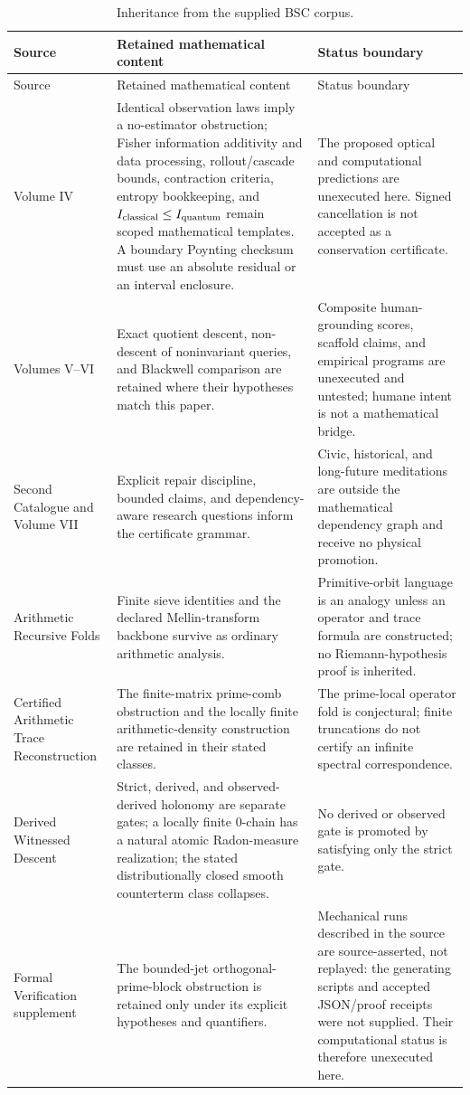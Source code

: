 \documentclass[11pt,a4paper]{article}
\theoremstyle{definition}
\theoremstyle{plain}
\theoremstyle{remark}
\begin{document}
\begingroup
\small
\begin{longtable}{L{0.18\textwidth}L{0.35\textwidth}L{0.37\textwidth}}
\caption{Inheritance from the supplied BSC corpus.}\label{tab:inheritance}\\
\toprule
Source & Retained mathematical content & Status boundary\\
\midrule
\endfirsthead
\toprule
Source & Retained mathematical content & Status boundary\\
\midrule
\endhead
Volume IV \citep{BSCvol4} &
Identical observation laws imply a no-estimator obstruction; Fisher
information additivity and data processing, rollout/cascade bounds,
contraction criteria, entropy bookkeeping, and
\(I_{\rm classical}\le I_{\rm quantum}\) remain scoped mathematical
templates.  A boundary Poynting checksum must use an absolute residual or an
interval enclosure. &
The proposed optical and computational predictions are unexecuted here.
Signed cancellation is not accepted as a conservation certificate.\\
Volumes V--VI \citep{BSCvol5,BSCvol6} &
Exact quotient descent, non-descent of noninvariant queries, and Blackwell
comparison are retained where their hypotheses match this paper. &
Composite human-grounding scores, scaffold claims, and empirical programs are
unexecuted and untested; humane intent is not a mathematical bridge.\\
Second Catalogue and Volume VII \citep{BSCsecond,BSCvol7} &
Explicit repair discipline, bounded claims, and dependency-aware research
questions inform the certificate grammar. &
Civic, historical, and long-future meditations are outside the mathematical
dependency graph and receive no physical promotion.\\
Arithmetic Recursive Folds \citep{tree2026arithmeticfolds} &
Finite sieve identities and the declared Mellin-transform backbone survive as
ordinary arithmetic analysis. &
Primitive-orbit language is an analogy unless an operator and trace formula
are constructed; no Riemann-hypothesis proof is inherited.\\
Certified Arithmetic Trace Reconstruction
\citep{tree2026tracereconstruction} &
The finite-matrix prime-comb obstruction and the locally finite
arithmetic-density construction are retained in their stated classes. &
The prime-local operator fold is conjectural; finite truncations do not
certify an infinite spectral correspondence.\\
Derived Witnessed Descent \citep{tree2026deriveddescent} &
Strict, derived, and observed-derived holonomy are separate gates; a locally
finite \(0\)-chain has a natural atomic Radon-measure realization; the stated
distributionally closed smooth counterterm class collapses. &
No derived or observed gate is promoted by satisfying only the strict gate.\\
Formal Verification supplement \citep{formalverification2026} &
The bounded-jet orthogonal-prime-block obstruction is retained only under its
explicit hypotheses and quantifiers. &
Mechanical runs described in the source are source-asserted, not replayed:
the generating scripts and accepted JSON/proof receipts were not supplied.
Their computational status is therefore unexecuted here.\\
\bottomrule
\end{longtable}
\end{document}
